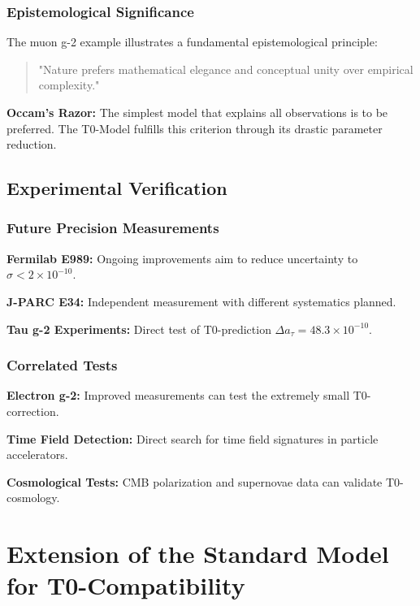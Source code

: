 \documentclass[12pt,a4paper]{report}
\begin{document}
	\subsection{Epistemological Significance}\label{subsec:epistemological_significance}
	
	The muon g-2 example illustrates a fundamental epistemological principle:
	\begin{quote}
		"Nature prefers mathematical elegance and conceptual unity over empirical complexity."
	\end{quote}
	
	\textbf{Occam's Razor:}
	The simplest model that explains all observations is to be preferred. The T0-Model fulfills this criterion through its drastic parameter reduction.
	
	\section{Experimental Verification}\label{sec:experimental_verification}
	
	\subsection{Future Precision Measurements}\label{subsec:future_measurements}
	
	\textbf{Fermilab E989:}
	Ongoing improvements aim to reduce uncertainty to $\sigma < 2 \times 10^{-10}$.
	
	\textbf{J-PARC E34:}
	Independent measurement with different systematics planned.
	
	\textbf{Tau g-2 Experiments:}
	Direct test of T0-prediction $\Delta a_\tau = 48.3 \times 10^{-10}$.
	
	\subsection{Correlated Tests}\label{subsec:correlated_tests}
	
	\textbf{Electron g-2:}
	Improved measurements can test the extremely small T0-correction.
	
	\textbf{Time Field Detection:}
	Direct search for time field signatures in particle accelerators.
	
	\textbf{Cosmological Tests:}
	CMB polarization and supernovae data can validate T0-cosmology.
	\chapter{Extension of the Standard Model for T0-Compatibility}\label{chap:sm_extension}
	
\end{document}
